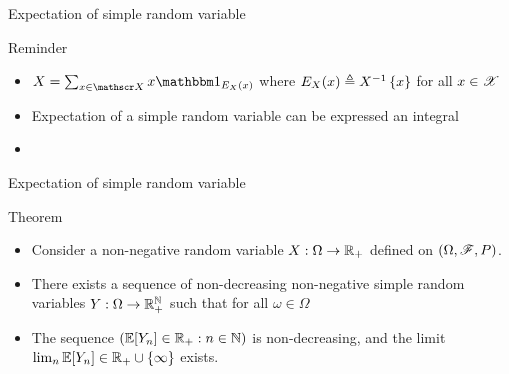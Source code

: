 \documentclass[12pt,aspectratio=169]{beamer}
\begin{document}
\begin{frame}{Expectation of simple random variable}
\begin{block}{Reminder} 
\begin{itemize}
    \item <1-> $X = \sum_{x \in \sX}x\Ind{E_X(x)}$ where  $E_X(x) \triangleq X^{-1}\left\{x\right\}$ for all $x\in\mathscr{X}$
    \item <2-> Expectation of a simple random variable can be expressed an integral 
    \item <3-> 
\end{itemize} 
\end{block}
\end{frame}

\begin{frame}{Expectation of simple random variable}
\begin{block}{Theorem}
\begin{itemize}
\item <1-> Consider a non-negative random variable $X: \Omega \to \mathbb{R}_+$ defined on $(\Omega, \mathscr{F}, P)$.  
\item <2-> There exists a sequence of non-decreasing non-negative simple random variables $Y: \Omega \to \mathbb{R}_+^{\mathbb{N}}$ such that for all $\omega \in \Omega$
\item <3-> %
The sequence $(\mathbb{E}[Y_n] \in \mathbb{R}_+: n \in \mathbb{N})$ is non-decreasing, 
and the limit $\lim_n\mathbb{E}[Y_n] \in \mathbb{R}_+\cup\left\{\infty\right\}$ exists.  
\end{itemize}
\end{block}
\end{frame}
\end{document}
